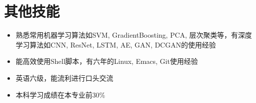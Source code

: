 \documentclass{resume}
\begin{document}
\section{其他技能}
\begin{itemize}%
\item 熟悉常用机器学习算法如SVM, GradientBoosting, PCA, 层次聚类等，有深度学习算法如CNN, ResNet, LSTM, AE, GAN, DCGAN的使用经验
\item 能高效使用Shell脚本，有六年的Linux, Emacs, Git使用经验
\item 英语六级，能流利进行口头交流
\item 本科学习成绩在本专业前30\%
\end{itemize}



%  
\end{document}
